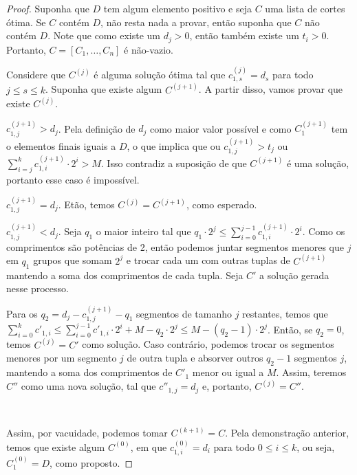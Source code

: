 \begin{proof}
    Suponha que $D$ tem algum elemento positivo e seja $C$ uma lista de cortes ótima. Se $C$ contém $D$, não resta nada a provar, então suponha que $C$ não contém $D$. Note que como existe um $d_j > 0$, então também existe um $t_i > 0$. Portanto, $C = [C_1, \ldots, C_n]$ é não-vazio.

    Considere que $C^{(j)}$ é alguma solução ótima tal que $c^{(j)}_{1, s} = d_s$ para todo $j \leq s \leq k$. Suponha que existe algum $C^{(j + 1)}$. A partir disso, vamos provar que existe $C^{(j)}$.

    \begin{casos}
        \item $c^{(j + 1)}_{1, j} > d_j$. Pela definição de $d_j$ como maior valor possível e como $C^{(j + 1)}_1$ tem o elementos finais iguais a $D$, o que implica que ou $c^{(j + 1)}_{1, j} > t_j$ ou $\sum_{i = j}^k c^{(j + 1)}_{1, i} \cdot 2^i > M$. Isso contradiz a suposição de que $C^{(j + 1)}$ é uma solução, portanto esse caso é impossível.

        \item $c^{(j + 1)}_{1, j} = d_j$. Etão, temos $C^{(j)} = C^{(j + 1)}$, como esperado.

        \item $c^{(j + 1)}_{1, j} < d_j$. Seja $q_1$ o maior inteiro tal que $q_1 \cdot 2^j \leq \sum_{i = 0}^{j - 1} c^{(j + 1)}_{1, i} \cdot 2^i$. Como os comprimentos são potências de 2, então podemos juntar segmentos menores que $j$ em $q_1$ grupos que somam $2^j$ e trocar cada um com outras tuplas de $C^{(j + 1)}$ mantendo a soma dos comprimentos de cada tupla. Seja $C'$ a solução gerada nesse processo.

        Para os $q_2 = d_j - c^{(j + 1)}_{1, j} - q_1$ segmentos de tamanho $j$ restantes, temos que $\sum_{i = 0}^k c'_{1, i} \leq \sum_{i = 0}^{j - 1} c'_{1, i} \cdot 2^i + M - q_2 \cdot 2^j \leq M - (q_2 - 1) \cdot 2^j$. Então, se $q_2 = 0$, temos $C^{(j)} = C'$ como solução. Caso contrário, podemos trocar os segmentos menores por um segmento $j$ de outra tupla e absorver outros $q_2 - 1$ segmentos $j$, mantendo a soma dos comprimentos de $C'_1$ menor ou igual a $M$. Assim, teremos $C''$ como uma nova solução, tal que $c''_{1, j} = d_j$ e, portanto, $C^{(j)} = C''$.
    \end{casos}

    ~

    Assim, por vacuidade, podemos tomar $C^{(k + 1)} = C$. Pela demonstração anterior, temos que existe algum $C^{(0)}$, em que $c^{(0)}_{1,i} = d_i$ para todo $0 \leq i \leq k$, ou seja, $C^{(0)}_1 = D$, como proposto.
\end{proof}

